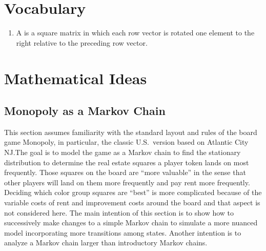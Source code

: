\documentclass[12pt]{article}
\begin{document}
\hr

\section*{Vocabulary}
\begin{enumerate}
    \item
        A  is a square matrix in which each row
        vector is rotated one element to the right relative to the
        preceding row vector.
\end{enumerate}

\hr

\section*{Mathematical Ideas}
\subsection*{Monopoly as a Markov Chain }

This section assumes familiarity with the standard layout and rules of
the board game Monopoly, in particular, the classic U.S.\ version based
on Atlantic City NJ.\@ The goal is to model the game as a Markov chain
to find the stationary distribution to determine the real estate squares
a player token lands on most frequently.  Those squares on the board are
``more valuable'' in the sense that other players will land on them more
frequently and pay rent more frequently.  Deciding which color group
squares are ``best'' is more complicated because of the variable costs
of rent and improvement costs around the board and that aspect is not
considered here.  The main intention of this section is to show how to
successively make changes to a simple Markov chain to simulate a more
nuanced model incorporating more transitions among states.  Another
intention is to analyze a Markov chain larger than introductory Markov
chains.
\end{document}
